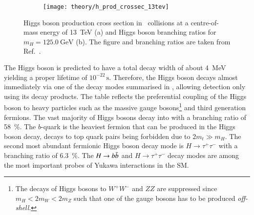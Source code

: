 \begin{figure}[htbp]
  \centering

  \begin{subfigure}[b]{0.47\textwidth}
    \centering

    \texttt{[image: theory/h\_prod\_crossec\_13tev]}

    \label{fig:higgs_prod_xsec}
  \end{subfigure}\hfill%
  \begin{subfigure}[b]{0.47\textwidth}
    \centering

    {
      \renewcommand{\arraystretch}{1.1}%
      
    }

    \vspace*{1.5em}

    \label{tab:higgs_branching_ratios}
  \end{subfigure}

  \caption[Higgs boson production cross section and branching ratios.]{Higgs
    boson production cross section in \pp~collisions at a centre-of-mass energy
    of \SI{13}{\TeV} (a) and Higgs boson branching ratios for
    $m_{H} = \SI{125.0}{\GeV}$ (b). The figure and branching ratios are taken
    from Ref.~\cite{deFlorian:2016spz}.}
\end{figure}

The Higgs boson is predicted to have a total decay width of about
\SI{4}{\MeV}~\cite{deFlorian:2016spz} yielding a proper lifetime of
$10^{-22}\,\si{\second}$. Therefore, the Higgs boson decays almost immediately
via one of the decay modes summarised in ,
allowing detection only using its decay products. The table reflects the
preferential coupling of the Higgs boson to heavy particles such as the massive
gauge bosons\footnote{The decays of Higgs bosons to $W^+W^-$ and $ZZ$ are
  suppressed since $m_{H} < 2 m_{W} < 2 m_{Z}$ such that one of the gauge bosons
  has to be produced \emph{off-shell}.} and third generation fermions. The vast
majority of Higgs bosons decay into \bbbar with a branching ratio of
\SI{58}{\percent}. The $b$-quark is the heaviest fermion that can be produced in
the Higgs boson decay, decays to top quark pairs being forbidden due to
$2 m_t \gg m_H$. The second most abundant fermionic Higgs boson decay mode is
$H \to \tau^+ \tau^-$ with a branching ratio of \SI{6.3}{\percent}. The
$H \to b\bar{b}$ and $H \to \tau^+ \tau^-$ decay modes are among the most
important probes of Yukawa interactions in the SM.


